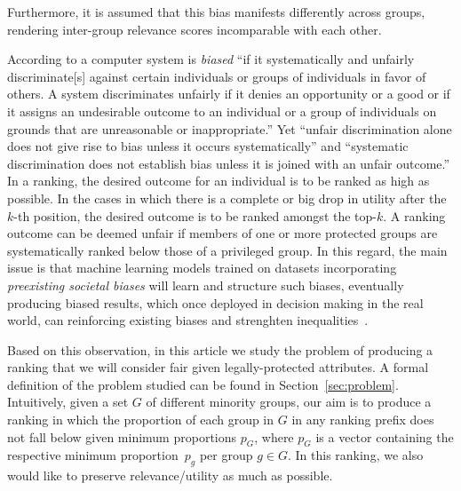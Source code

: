 Furthermore, it is assumed that this bias manifests differently across groups, rendering inter-group relevance scores incomparable with each other.
%

According to \citet{friedman1996bias} a computer system is \emph{biased} ``if it systematically and unfairly discriminate[s] against certain individuals or groups of individuals in favor of others.
%
A system discriminates unfairly if it denies an opportunity or a good or if it assigns an undesirable outcome to an individual or a group of individuals on grounds that are unreasonable or inappropriate.''
%
Yet ``unfair discrimination alone does not give rise to bias unless it occurs systematically'' and ``systematic discrimination does not establish bias unless it is joined with an unfair outcome.''
%
In a ranking, the desired outcome for an individual is to be ranked as high as possible. In the cases in which there is a complete or big drop in utility after the $k$-th position, the desired outcome is to be ranked amongst the top-$k$. A ranking outcome can be deemed unfair if members of one or more protected groups are systematically ranked below those of a privileged group.
%
%
In this regard, the main issue is that machine learning models trained on datasets incorporating \textit{preexisting societal biases} will learn and structure such biases, eventually producing biased results, which once deployed in decision making in the real world, can reinforcing existing biases and strenghten inequalities~\cite{oneil2016weapons}.
%

Based on this observation, in this article we study the problem of producing a ranking that we will consider fair given legally-protected attributes.
%
A formal definition of the problem studied can be found in Section~\ref{sec:problem}.
%
Intuitively, given a set $G$ of different minority groups, our aim is to produce a ranking in which the proportion of each group in $G$ in any ranking prefix does not fall below given minimum proportions $p_G$, where $p_G$ is a vector containing the respective minimum proportion~$p_g$ per group $g \in G$. In this ranking, we also would like to preserve relevance/utility as much as possible.
%
%

